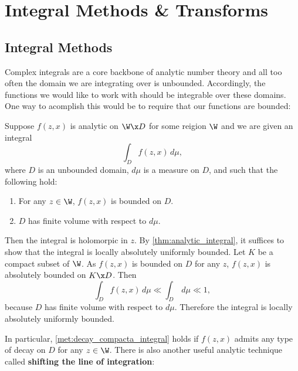     \section{Integral Methods \& Transforms}
      \subsection*{Integral Methods}
        Complex integrals are a core backbone of analytic number theory and all too often the domain we are integrating over is unbounded. Accordingly, the functions we would like to work with should be integrable over these domains. One way to acomplish this would be to require that our functions are bounded:

        \begin{method}\label{met:decay_compacta_integral}
          Suppose $f(z,x)$ is analytic on $\W \x D$ for some reigion $\W$ and we are given an integral
          \[
            \int_{D}f(z,x)\,d\mu,
          \]
          where $D$ is an unbounded domain, $d\mu$ is a measure on $D$, and such that the following hold:
          \begin{enumerate}[label=(\roman*)]
            \item For any $z \in \W$, $f(z,x)$ is bounded on $D$.
            \item $D$ has finite volume with respect to $d\mu$.
          \end{enumerate}
          Then the integral is holomorpic in $z$. By \cref{thm:analytic_integral}, it suffices to show that the integral is locally absolutely uniformly bounded. Let $K$ be a compact subset of $\W$. As $f(z,x)$ is bounded on $D$ for any $z$, $f(z,x)$ is absolutely bounded on $K \x D$. Then
          \[
            \int_{D}f(z,x)\,d\mu \ll \int_{D}\,d\mu \ll 1, 
          \]
          because $D$ has finite volume with respect to $d\mu$. Therefore the integral is  locally absolutely uniformly bounded. 
        \end{method}

        In particular, \cref{met:decay_compacta_integral} holds if $f(z,x)$ admits any type of decay on $D$ for any $z \in \W$. There is also another useful analytic technique called \textbf{shifting the line of integration}:

